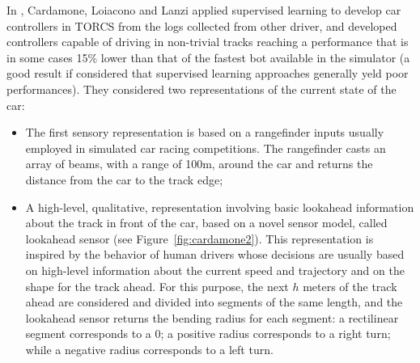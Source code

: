 In  \cite{cardamone}, Cardamone, Loiacono and Lanzi applied supervised learning to develop car controllers in TORCS from the logs collected from other driver, and developed controllers capable of driving in non-trivial tracks reaching a performance that is in some cases 15\% lower than that of the fastest bot available in
the simulator (a good result if considered that supervised learning approaches generally yeld poor performances).
They considered two representations of the current state of the car:
\begin{itemize}
\item The first sensory representation is based on a rangefinder inputs usually employed in simulated car racing competitions.
The rangefinder casts an array of beams, with a range of 100m, around the car and returns the distance from the car to the track edge;
\item  A high-level, qualitative, representation involving basic lookahead information about the track in front of the car, based on a  novel sensor model, called lookahead sensor (see Figure~\ref{fig:cardamone2}). This representation is inspired by the behavior of human drivers whose decisions are usually based on high-level information about the current speed and trajectory and on the shape for the track ahead. 
For this purpose, the next $h$ meters of the track ahead are considered and divided into segments of the same length, and the lookahead sensor returns the bending radius for each segment: a rectilinear segment corresponds to a $0$; a positive radius corresponds to a right turn; while a negative radius corresponds to a left turn. 
\end{itemize} 

